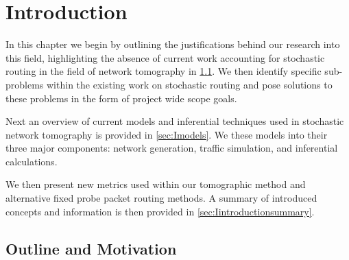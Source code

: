 \chapter{Introduction}
\label{cha:intro}
In this chapter we begin by outlining the justifications behind our research into this field, highlighting the absence of current work accounting for stochastic routing in the field of network tomography in \cref{sec:Imotivationandoutline}. We then identify specific sub-problems within the existing work on stochastic routing and pose solutions to these problems
in the form of project wide scope goals.\par
Next an overview of current models and inferential techniques used in stochastic network tomography is provided in \cref{sec:Imodels}. We these models into their three major components: network generation, traffic simulation, and inferential calculations.\par
We then present new metrics used within our tomographic method and alternative fixed probe packet routing methods. A summary of introduced concepts and information is then provided in \cref{sec:Iintroductionsummary}.\par

\section{Outline and Motivation}
\label{sec:Imotivationandoutline}


